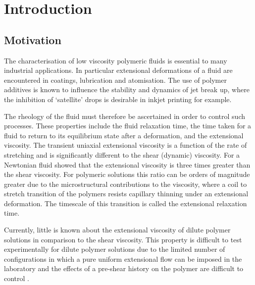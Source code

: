 \documentclass[11pt]{article}
\begin{document}
\section{Introduction}

\subsection{Motivation}
The characterisation of low viscosity polymeric fluids is essential to many industrial applications. In particular extensional deformations of a fluid are encountered in coatings, lubrication and atomisation. The use of polymer additives is known to influence the stability and dynamics of jet break up, where the inhibition of `satellite' drops is desirable in inkjet printing for example.

The rheology of the fluid must therefore be ascertained in order to control such processes. These properties include the fluid relaxation time, the time taken for a fluid to return to its equilibrium state after a deformation, and the extensional viscosity. The transient uniaxial extensional viscosity is a function of the rate of stretching and is significantly different to the shear (dynamic) viscosity. For a Newtonian fluid \cite{fred1906coefficient} showed that the extensional viscosity is three times greater than the shear viscosity. For polymeric solutions this ratio can be orders of magnitude greater due to the microstructural contributions to the viscosity, where a coil to stretch transition of the polymers resists capillary thinning under an extensional deformation. The timescale of this transition is called the extensional relaxation time.

Currently, little is known about the extensional viscosity of dilute polymer solutions in comparison to the shear viscosity. This property is difficult to test experimentally for dilute polymer solutions due to the limited number of configurations in which a pure uniform extensional flow can be imposed in the laboratory and the effects of a pre-shear history on the polymer are difficult to control \citep{petrie2006extensional}.
\end{document}
